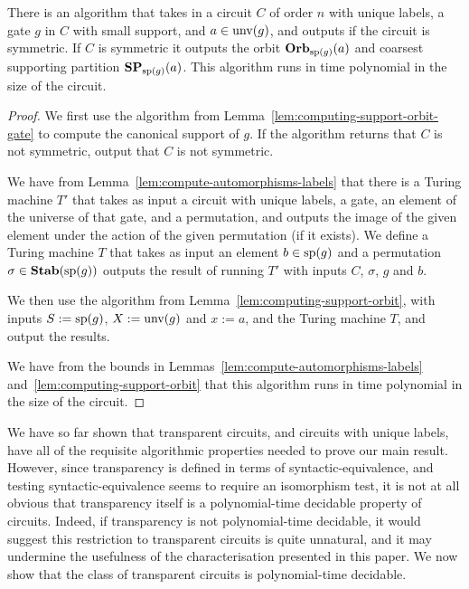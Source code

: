 \documentclass[../main/thesis.tex]{subfiles}
\begin{document}
\begin{lem}
  There is an algorithm that takes in a circuit $C$ of order $n$ with unique
  labels, a gate $g$ in $C$ with small support, and $a \in \text{unv}(g)$, and
  outputs if the circuit is symmetric. If $C$ is symmetric it outputs the orbit
  $\text{\textbf{Orb}}_{\text{sp}(g)} (a)$ and coarsest supporting partition $\text{\textbf{SP}}_{\text{sp}(g)}(a)$.
  This algorithm runs in time polynomial in the size of the circuit.
  \label{lem:computing-support-orbit-index}
\end{lem}
\begin{proof}
  We first use the algorithm from Lemma~\ref{lem:computing-support-orbit-gate}
  to compute the canonical support of $g$. If the algorithm returns that $C$ is
  not symmetric, output that $C$ is not symmetric.

  We have from Lemma~\ref{lem:compute-automorphisms-labels} that there is a
  Turing machine $T'$ that takes as input a circuit with unique labels, a gate,
  an element of the universe of that gate, and a permutation, and outputs the
  image of the given element under the action of the given permutation (if it
  exists). We define a Turing machine $T$ that takes as input an element $b \in
  \text{sp}(g)$ and a permutation $\sigma \in \text{\textbf{Stab}} (\text{sp} (g))$ outputs the result of
  running $T'$ with inputs $C$, $\sigma$, $g$ and $b$.

  We then use the algorithm from Lemma~\ref{lem:computing-support-orbit}, with
  inputs $S := \text{sp}(g)$, $X := \text{unv}(g)$ and $x:= a$, and the Turing
  machine $T$, and output the results.

  We have from the bounds in Lemmas~\ref{lem:compute-automorphisms-labels}
  and~\ref{lem:computing-support-orbit} that this algorithm runs in time
  polynomial in the size of the circuit.
\end{proof}

We have so far shown that transparent circuits, and circuits with unique labels,
have all of the requisite algorithmic properties needed to prove our main
result. However, since transparency is defined in terms of
syntactic-equivalence, and testing syntactic-equivalence seems to require an
isomorphism test, it is not at all obvious that transparency itself is a
polynomial-time decidable property of circuits. Indeed, if transparency is not
polynomial-time decidable, it would suggest this restriction to transparent
circuits is quite unnatural, and it may undermine the usefulness of the
characterisation presented in this paper. We now show that the class of
transparent circuits is polynomial-time decidable.
\end{document}
